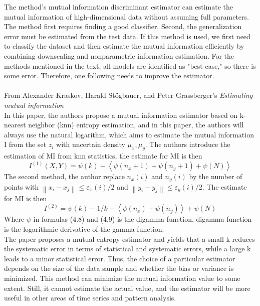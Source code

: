The method's mutual information discriminant estimator can estimate the mutual information of high-dimensional data without assuming full parameters. The method first requires finding a good classifier. Second, the generalization error must be estimated from the test data. If this method is used, we first need to classify the dataset and then estimate the mutual information efficiently by combining downscaling and nonparametric information estimation. For the methods mentioned in the text, all models are identified as "best case," so there is some error. Therefore, one following needs to improve the estimator.
\\ \hspace*{\fill} \\
From Alexander Kraskov, Harald St\"ogbauer, and Peter Grassberger's \emph{Estimating mutual information } \cite{kraskov2004estimating}\\
In this paper, the authors propose a mutual information estimator based on k-nearest neighbor (knn) entropy estimation, and in this paper, the authors will always use the natural logarithm, which aims to estimate the mutual information I from the set $z_{i} $ with uncertain density $ \mu _{x},\mu _{y} $.
The authors introduce the estimation of MI from knn statistics, the estimate for MI is then
\begin{equation}
I^{(1)}(X,Y) =  \psi(k) - 
\left \langle \psi (n_{x}+1 ) + \psi (n_{y}+1 ) +\psi (N) \right \rangle   
\end{equation}
The second method, the author replace $n_{x}(i)$ and $n_{y}(i)$ by the number of points with $\left \| x_{i} - x_{j}  \right \| \le \varepsilon _{x}(i) /2$ and $\left \| y_{i} - y_{j}  \right \| \le \varepsilon _{y}(i) /2$. The estimate for MI is then
\begin{equation}
I^{(2)}  = \psi (k) -1/k -
\left \langle \psi (n_{x} ) + \psi (n_{y} ) \right \rangle + \psi (N)
\end{equation}
Where $\psi$ in formulas (4.8) and (4.9) is the digamma function, digamma function is the logarithmic derivative of the gamma function.\\
The paper proposes a mutual entropy estimator and yields that a small k reduces the systematic error in terms of statistical and systematic errors, while a large k leads to a minor statistical error. Thus, the choice of a particular estimator depends on the size of the data sample and whether the bias or variance is minimized. This method can minimize the mutual information value to some extent. Still, it cannot estimate the actual value, and the estimator will be more useful in other areas of time series and pattern analysis.
\\ \hspace*{\fill} \\






